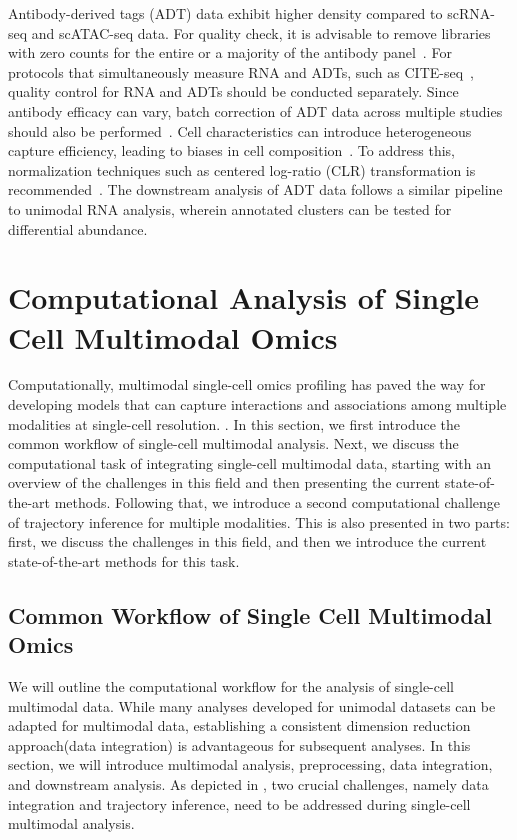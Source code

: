 Antibody-derived tags (ADT) data exhibit higher density compared to scRNA-seq and scATAC-seq data. For quality check, it is advisable to remove libraries with zero counts for the entire or a majority of the antibody panel~\citep{amezquita2020adtqc}. For protocols that simultaneously measure RNA and ADTs, such as CITE-seq~\citep{citeseq2017}, quality control for RNA and ADTs should be conducted separately. Since antibody efficacy can vary, batch correction of ADT data across multiple studies should also be performed~\citep{zheng2022adtqc}. Cell characteristics can introduce heterogeneous capture efficiency, leading to biases in cell composition~\citep{zheng2022adtqc}. To address this, normalization techniques such as centered log-ratio (CLR) transformation is recommended~\citep{stoeckius2017simultaneous}. The downstream analysis of ADT data follows a similar pipeline to unimodal RNA analysis, wherein annotated clusters can be tested for differential abundance.


\section{Computational Analysis of Single Cell Multimodal Omics}
\label{background:multimodal}
Computationally, multimodal single-cell omics profiling has paved the way for developing models that can capture interactions and associations among multiple modalities at single-cell resolution. . In this section, we first introduce the common workflow of single-cell multimodal analysis. Next, we discuss the computational task of integrating single-cell multimodal data, starting with an overview of the challenges in this field and then presenting the current state-of-the-art methods. Following that, we introduce a second computational challenge of trajectory inference for multiple modalities. This is also presented in two parts: first, we discuss the challenges in this field, and then we introduce the current state-of-the-art methods for this task.

\subsection{Common Workflow of Single Cell Multimodal Omics}
\label{background:multimodal}
We will outline the computational workflow for the analysis of single-cell multimodal data. While many analyses developed for unimodal datasets can be adapted for multimodal data, establishing a consistent dimension reduction approach(data integration) is advantageous for subsequent analyses. In this section, we will introduce multimodal analysis, preprocessing, data integration, and downstream analysis. As depicted in , two crucial challenges, namely data integration and trajectory inference, need to be addressed during single-cell multimodal analysis.

